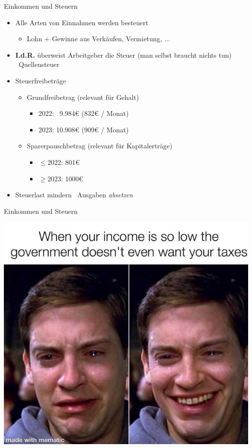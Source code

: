 \documentclass{beamer}
\begin{document}
			\begin{frame}[label={einkommen-und-steuern}]{Einkommen und Steuern}
				\begin{itemize}
					\item Alle Arten von Einnahmen werden besteuert
					\begin{itemize}
						\item Lohn + Gewinne aus Verkäufen, Vermietung, ...
					\end{itemize}
					\item \textbf{I.d.R.} überweist Arbeitgeber die Steuer (man selbst braucht nichts tun) \textrightarrow\ Quellensteuer
					\item Steuerfreibeträge
					\begin{itemize}
						\item Grundfreibetrag (relevant für Gehalt)
						\begin{itemize}
							\item 2022: \ 9.984€ (832€ / Monat)
							\item 2023: 10.908€ (909€ / Monat)
						\end{itemize}
						\item Sparerpauschbetrag (relevant für Kapitalerträge)
						\begin{itemize}
							\item $\leq2022$: 801€
							\item $\geq2023$: 1000€
						\end{itemize}
					\end{itemize}
					\item Steuerlast mindern \textrightarrow\ Ausgaben \textit{absetzen}
				\end{itemize}
			\end{frame}
			
			\begin{frame}{Einkommen und Steuern}
				\begin{center}
					\includegraphics[height=0.85\textheight]{images/meme-low-income.jpg}
				\end{center}
			\end{frame}
		
\end{document}
